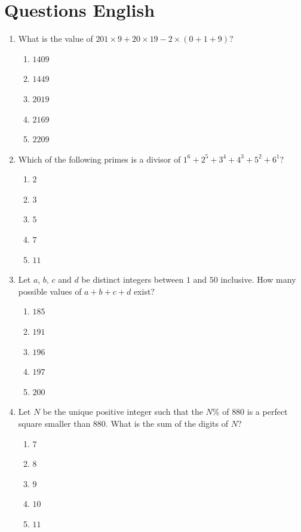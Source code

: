 \documentclass[12pt]{scrartcl}
\begin{document}
\renewcommand*\contentsname{Daftar Isi}
\tableofcontents

\newpage

\section*{Questions English}

\begin{enumerate}

\item What is the value of $201\times9+20\times19-2\times(0+1+9)$?
\begin{enumerate}
    \item $1409$
    \item $1449$
    \item $2019$
    \item $2169$
    \item $2209$
\end{enumerate}

\item Which of the following primes is a divisor of $1^{6}+2^{5}+3^{4}+4^{3}+5^{2}+6^{1}$?
\begin{enumerate}
    \item $2$
    \item $3$
    \item $5$
    \item $7$
    \item $11$
\end{enumerate}

\item Let $a$, $b$, $c$ and $d$ be distinct integers between $1$ and $50$ inclusive. How many possible values of $a+b+c+d$ exist?
\begin{enumerate}
    \item $185$
    \item $191$
    \item $196$
    \item $197$
    \item $200$
\end{enumerate}

\item Let $N$ be the unique positive integer such that the $N$\% of $880$ is a perfect square smaller than $880$. What is the sum of the digits of $N$?
\begin{enumerate}
    \item $7$
    \item $8$
    \item $9$
    \item $10$
    \item $11$
\end{enumerate}


\end{enumerate}
\end{document}
